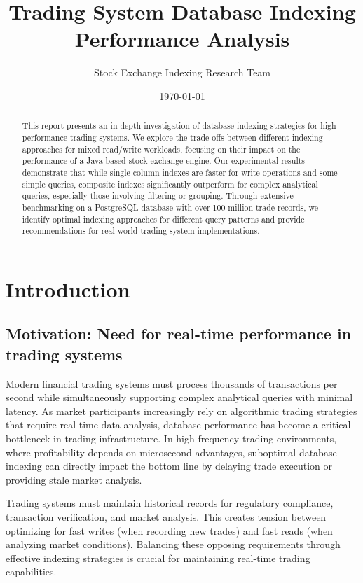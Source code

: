 \documentclass[11pt,a4paper]{article}
\title{\textbf{Trading System Database Indexing Performance Analysis}}
\author{Stock Exchange Indexing Research Team}
\date{\today}
\begin{document}
\maketitle

\begin{abstract}
This report presents an in-depth investigation of database indexing strategies for high-performance trading systems. We explore the trade-offs between different indexing approaches for mixed read/write workloads, focusing on their impact on the performance of a Java-based stock exchange engine. Our experimental results demonstrate that while single-column indexes are faster for write operations and some simple queries, composite indexes significantly outperform for complex analytical queries, especially those involving filtering or grouping. Through extensive benchmarking on a PostgreSQL database with over 100 million trade records, we identify optimal indexing approaches for different query patterns and provide recommendations for real-world trading system implementations.
\end{abstract}

\tableofcontents
\newpage

\section{Introduction}

\subsection{Motivation: Need for real-time performance in trading systems}

Modern financial trading systems must process thousands of transactions per second while simultaneously supporting complex analytical queries with minimal latency. As market participants increasingly rely on algorithmic trading strategies that require real-time data analysis, database performance has become a critical bottleneck in trading infrastructure. In high-frequency trading environments, where profitability depends on microsecond advantages, suboptimal database indexing can directly impact the bottom line by delaying trade execution or providing stale market analysis.

Trading systems must maintain historical records for regulatory compliance, transaction verification, and market analysis. This creates tension between optimizing for fast writes (when recording new trades) and fast reads (when analyzing market conditions). Balancing these opposing requirements through effective indexing strategies is crucial for maintaining real-time trading capabilities.
\end{document}
